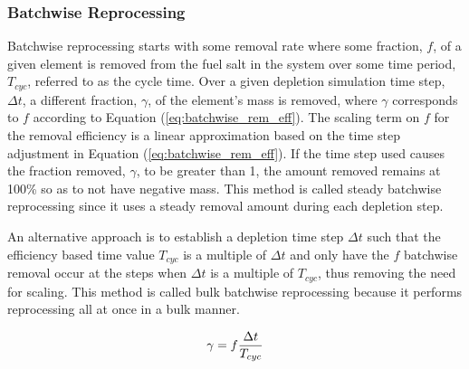 \subsubsection{Batchwise Reprocessing}


Batchwise reprocessing starts with some removal rate where some fraction, $f$, of a given element is removed from the fuel salt in the system over some time period, $T_{cyc}$, referred to as the cycle time. Over a given depletion simulation time step, $\Delta t$, a different fraction, $\gamma$, of the element's mass is removed, where $\gamma$ corresponds to $f$ according to Equation (\ref{eq:batchwise_rem_eff}). The scaling term on $f$ for the removal efficiency is a linear approximation based on the time step adjustment in Equation (\ref{eq:batchwise_rem_eff}). If the time step used causes the fraction removed, $\gamma$, to be greater than 1, the amount removed remains at 100\% so as to not have negative mass. This method is called steady batchwise reprocessing since it uses a steady removal amount during each depletion step.

An alternative approach is to establish a depletion time step $\Delta t$ such that the efficiency based time value $T_{cyc}$ is a multiple of $\Delta t$ and only have the $f$ batchwise removal occur at the steps when $\Delta t$ is a multiple of $T_{cyc}$, thus removing the need for scaling. This method is called bulk batchwise reprocessing because it performs reprocessing all at once in a bulk manner.

\begin{equation} \hfill 
\gamma = f \frac{\Delta t}{T_{cyc}}
\hfill\label{eq:batchwise_rem_eff} \end{equation}

